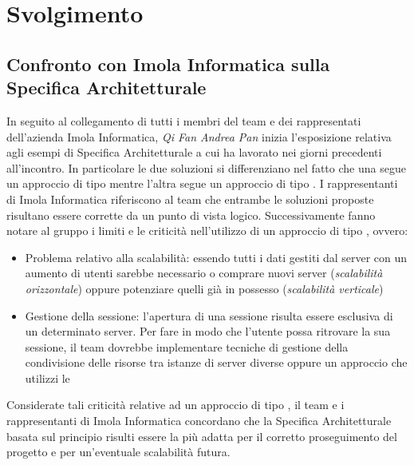 \section{Svolgimento}

\subsection{Confronto con Imola Informatica sulla Specifica Architetturale} 
In seguito al collegamento di tutti i membri del team e dei rappresentati dell'azienda Imola Informatica, \textit{Qi Fan Andrea Pan} inizia l'esposizione relativa agli esempi di Specifica Architetturale a cui ha lavorato nei giorni precedenti all'incontro. In particolare le due soluzioni si differenziano nel fatto che una segue un approccio di tipo  mentre l'altra segue un approccio di tipo . \newline
I rappresentanti di Imola Informatica riferiscono al team che entrambe le soluzioni proposte risultano essere corrette da un punto di vista logico. Successivamente fanno notare al gruppo i limiti e le criticità nell'utilizzo di un approccio di tipo , ovvero: 
\begin{itemize}
    \item Problema relativo alla scalabilità: essendo tutti i dati gestiti dal server con un aumento di utenti sarebbe necessario o comprare nuovi server (\textit{scalabilità orizzontale}) oppure potenziare quelli già in possesso (\textit{scalabilità verticale})
    \item Gestione della sessione: l'apertura di una sessione risulta essere esclusiva di un determinato server. Per fare in modo che l'utente possa ritrovare la sua sessione, il team dovrebbe implementare tecniche di gestione della condivisione delle risorse tra istanze di server diverse oppure un approccio che utilizzi le 
\end{itemize}
Considerate tali criticità relative ad un approccio di tipo , il team e i rappresentanti di Imola Informatica concordano che la Specifica Architetturale basata sul principio  risulti essere la più adatta per il corretto proseguimento del progetto e per un'eventuale scalabilità futura. 

